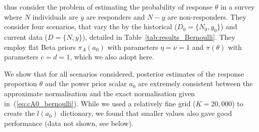 \documentclass[a4paper, notitlepage, 11pt]{article}
\begin{document}
\cite{Neuenschwander2009} thus consider the problem of estimating the probability of response $\theta$ in a survey where $N$ individuals are $y$ are responders and $N -y$ are non-responders.
They consider four scenarios, that vary the by the historical ($D_0 = \{N_0, y_0\}$) and current data ($D = \{N, y\}$), detailed in Table~\ref{tab:results_Bernoulli}.
They employ flat Beta priors $\pi_A(a_0)$ with parameters $\eta = \nu = 1$ and $\pi(\theta)$ with parameters $c = d = 1$, which we also adopt here.

We show that for all scenarios considered, posterior estimates of the response proportion $\theta$ and the power prior scalar $a_0$ are extremely consistent between the approximate normalisation and the exact normalisation given in~(\ref{eq:cA0_bernoulli}).
While we used a relatively fine grid ($K = 20, 000$) to create the $l(a_0)$ dictionary, we found that smaller values also gave good performance (data not shown, see below).
\end{document}
